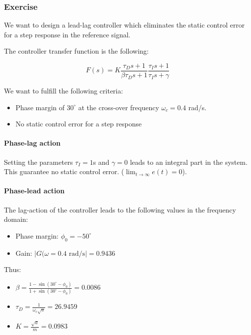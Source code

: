 \subsubsection{Exercise}
\label{exo411}

We want to design a lead-lag controller which eliminates the static control error for a step response in the reference signal.

The controller transfer function is the following:

$$ F(s) = K \frac{\tau_D s + 1}{\beta \tau_D s + 1} \frac{\tau_I s + 1}{\tau_I s + \gamma}$$

We want to fulfill the following criteria:
\begin{itemize}
 \item Phase margin of $30^{\circ}$ at the cross-over frequency $\omega_c = 0.4$ rad/s.
 \item No static control error for a step response 
\end{itemize}

\paragraph{Phase-lag action}
Setting the parameters $ \tau_I = 1$s and $\gamma = 0$ leads to an integral part in the system. 
This guarantee no static control error. ($\lim_{t\rightarrow\infty} e(t) = 0$).

\paragraph{Phase-lead action}

The lag-action of the controller leads to the following values in the frequency domain:
\begin{itemize}
    \item Phase margin: $\phi_0 = -50^{\circ}$
    \item Gain: $|G(\omega = 0.4\text{ rad/s}| = 0.9436$ 
\end{itemize}

Thus:

\begin{itemize}
    \item $\beta = \frac{1 - \sin(30^{\circ}-\phi_0)}{1 + \sin(30^{\circ} - \phi_0)} = 0.0086$
    \item $\tau_D = \frac{1}{\omega_c \sqrt{a}} = 26.9459$
    \item $K = \frac{\sqrt{a}}{m} = 0.0983$
\end{itemize}

